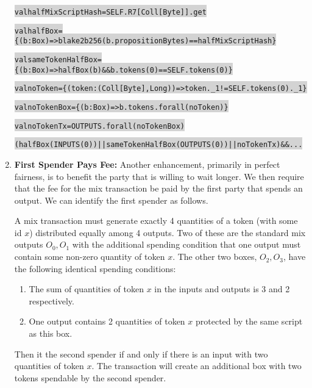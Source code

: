 \documentclass[11pt]{article}
\newcommand\Hi[2][lightgray]{%
	\hspace*{-\fboxsep}%
	\colorbox{#1}{#2}%
	\hspace*{-\fboxsep}%
}
\begin{document}
\begin{enumerate}
\begin{alltt}
\Hi{val halfMixScriptHash = SELF.R7[Coll[Byte]].get} 
\Hi{val halfBox = \{(b:Box) => blake2b256(b.propositionBytes) == halfMixScriptHash\}}
\Hi{val sameTokenHalfBox = \{(b:Box) => halfBox(b) && b.tokens(0) == SELF.tokens(0)\}}
\Hi{val noToken = \{(token:(Coll[Byte], Long)) => token._1 != SELF.tokens(0)._1\}}
\Hi{val noTokenBox = \{(b:Box) => b.tokens.forall(noToken)\}}
\Hi{val noTokenTx = OUTPUTS.forall(noTokenBox)} 
\Hi{(halfBox(INPUTS(0)) || sameTokenHalfBox(OUTPUTS(0)) || noTokenTx) && ...} 
\end{alltt}
\item \textbf{First Spender Pays Fee:} Another enhancement, primarily in perfect fairness, is to benefit the party that is willing to wait longer. We then require that the fee for the mix transaction be paid by the first party that spends an output. We can identify the first spender as follows. 

A mix transaction must generate exactly 4 quantities of a token (with some id $x$) distributed equally among 4 outputs. Two of these are the standard mix outputs $O_0, O_1$ with the additional spending condition that one output must contain some non-zero quantity of token $x$. The other two boxes, $O_2, O_3$, have the following identical spending conditions:
\begin{enumerate}
	\item The sum of quantities of token $x$ in the inputs and outputs is 3 and 2 respectively.
	\item One output contains 2 quantities of token $x$ protected by the same script as this box. 
\end{enumerate}

Then it the second spender if and only if there is an input with two quantities of token $x$. 
The transaction will create an additional box with two tokens spendable by the second spender.

\end{enumerate}
\end{document}
